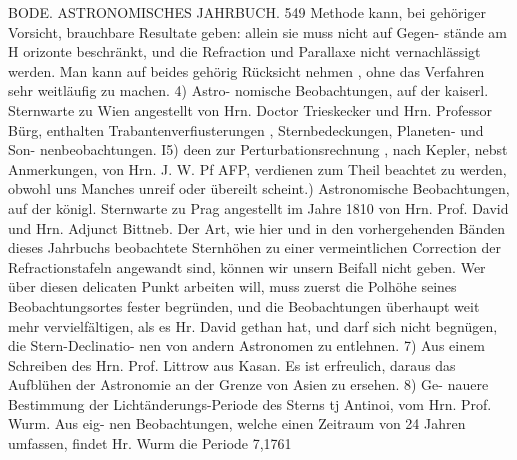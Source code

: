 \documentclass[12pt,a4paper]{article}
\begin{document}
\newpage
BODE. ASTRONOMISCHES JAHRBUCH. 549\newline
Methode kann, bei gehöriger Vorsicht, brauchbare Resultate geben: allein sie muss nicht auf Gegen-\newline
stände am H orizonte beschränkt, und die Refraction und Parallaxe nicht vernachlässigt werden. Man\newline
kann auf beides gehörig Rücksicht nehmen , ohne das Verfahren sehr weitläufig zu machen. 4) Astro-\newline
nomische Beobachtungen, auf der kaiserl. Sternwarte zu Wien angestellt von Hrn. Doctor Trieskecker\newline
und Hrn. Professor Bürg, enthalten Trabantenverfiusterungen , Sternbedeckungen, Planeten- und Son-\newline
nenbeobachtungen. I5) deen zur Perturbationsrechnung , nach Kepler, nebst Anmerkungen, von Hrn.\newline
J. W. Pf AFP, verdienen zum Theil beachtet zu werden, obwohl uns Manches unreif oder übereilt scheint.) Astronomische Beobachtungen, auf der königl. Sternwarte zu Prag angestellt im Jahre 1810 von Hrn.\newline
Prof. David und Hrn. Adjunct Bittneb. Der Art, wie hier und in den vorhergehenden Bänden dieses\newline
Jahrbuchs beobachtete Sternhöhen zu einer vermeintlichen Correction der Refractionstafeln angewandt\newline
sind, können wir unsern Beifall nicht geben. Wer über diesen delicaten Punkt arbeiten will, muss\newline
zuerst die Polhöhe seines Beobachtungsortes fester begründen, und die Beobachtungen überhaupt weit\newline
mehr vervielfältigen, als es Hr. David gethan hat, und darf sich nicht begnügen, die Stern-Declinatio-\newline
nen von andern Astronomen zu entlehnen. 7) Aus einem Schreiben des Hrn. Prof. Littrow aus Kasan.\newline
Es ist erfreulich, daraus das Aufblühen der Astronomie an der Grenze von Asien zu ersehen. 8) Ge-\newline
nauere Bestimmung der Lichtänderungs-Periode des Sterns tj Antinoi, vom Hrn. Prof. Wurm. Aus eig-\newline
nen Beobachtungen, welche einen Zeitraum von 24 Jahren umfassen, findet Hr. Wurm die Periode 7,1761\newline
\end{document}
